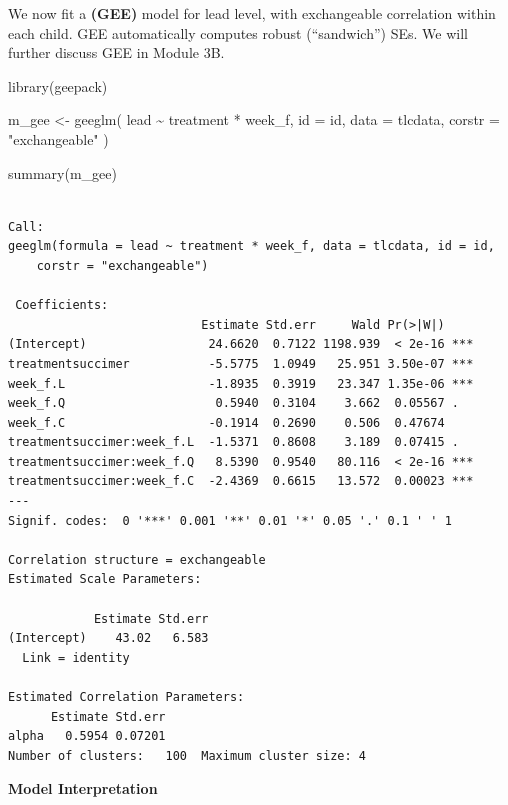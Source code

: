 \documentclass[
  letterpaper,
  DIV=11,
  numbers=noendperiod]{scrreprt}
\newenvironment{Shaded}{\begin{snugshade}}{\end{snugshade}}
\newcommand{\AttributeTok}[1]{\textcolor[rgb]{0.40,0.45,0.13}{#1}}
\newcommand{\FunctionTok}[1]{\textcolor[rgb]{0.28,0.35,0.67}{#1}}
\newcommand{\NormalTok}[1]{\textcolor[rgb]{0.00,0.23,0.31}{#1}}
\newcommand{\OtherTok}[1]{\textcolor[rgb]{0.00,0.23,0.31}{#1}}
\newcommand{\SpecialCharTok}[1]{\textcolor[rgb]{0.37,0.37,0.37}{#1}}
\newcommand{\StringTok}[1]{\textcolor[rgb]{0.13,0.47,0.30}{#1}}
\begin{document}
We now fit a \textbf{(GEE)} model for lead level, with exchangeable
correlation within each child. GEE automatically computes robust
(``sandwich'') SEs. We will further discuss GEE in Module 3B.

\begin{Shaded}
\begin{Highlighting}[]
\FunctionTok{library}\NormalTok{(geepack)}

\NormalTok{m\_gee }\OtherTok{\textless{}{-}} \FunctionTok{geeglm}\NormalTok{(}
\NormalTok{  lead }\SpecialCharTok{\textasciitilde{}}\NormalTok{ treatment }\SpecialCharTok{*}\NormalTok{ week\_f,}
  \AttributeTok{id     =}\NormalTok{ id,}
  \AttributeTok{data   =}\NormalTok{ tlcdata,}
  \AttributeTok{corstr =} \StringTok{"exchangeable"}
\NormalTok{)}

\FunctionTok{summary}\NormalTok{(m\_gee)}
\end{Highlighting}
\end{Shaded}

\begin{verbatim}

Call:
geeglm(formula = lead ~ treatment * week_f, data = tlcdata, id = id, 
    corstr = "exchangeable")

 Coefficients:
                           Estimate Std.err     Wald Pr(>|W|)    
(Intercept)                 24.6620  0.7122 1198.939  < 2e-16 ***
treatmentsuccimer           -5.5775  1.0949   25.951 3.50e-07 ***
week_f.L                    -1.8935  0.3919   23.347 1.35e-06 ***
week_f.Q                     0.5940  0.3104    3.662  0.05567 .  
week_f.C                    -0.1914  0.2690    0.506  0.47674    
treatmentsuccimer:week_f.L  -1.5371  0.8608    3.189  0.07415 .  
treatmentsuccimer:week_f.Q   8.5390  0.9540   80.116  < 2e-16 ***
treatmentsuccimer:week_f.C  -2.4369  0.6615   13.572  0.00023 ***
---
Signif. codes:  0 '***' 0.001 '**' 0.01 '*' 0.05 '.' 0.1 ' ' 1

Correlation structure = exchangeable 
Estimated Scale Parameters:

            Estimate Std.err
(Intercept)    43.02   6.583
  Link = identity 

Estimated Correlation Parameters:
      Estimate Std.err
alpha   0.5954 0.07201
Number of clusters:   100  Maximum cluster size: 4 
\end{verbatim}

\textbf{Model Interpretation}
\end{document}
